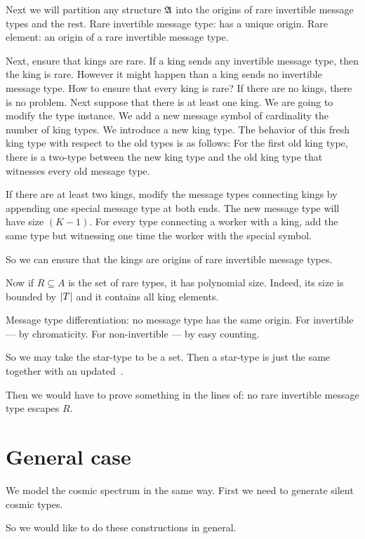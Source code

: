 Next we will partition any structure $\mathfrak{A}$ into the origins of rare invertible
message types and the rest.
Rare invertible message type: has a unique origin.
Rare element: an origin of a rare invertible message type.

Next, ensure that kings are rare.
If a king sends any invertible message type, then the king is rare.
However it might happen than a king sends no invertible message type.
How to ensure that every king is rare?
If there are no kings, there is no problem.
Next suppose that there is at least one king.
We are going to modify the type instance.
We add a new message symbol of cardinality the number of king types.
We introduce a new king type.
The behavior of this fresh king type with respect to the old types is as
follows:
For the first old king type, there is a two-type between the new king type and
the old king type that witnesses every old message type.

If there are at least two kings, modify the message types connecting kings by
appending one special message type at both ends.
The new message type will have size $(K-1)$.
For every type connecting a worker with a king, add the same type but witnessing
one time the worker with the special symbol.

So we can ensure that the kings are origins of rare invertible message types.

Now if $R \subseteq A$ is the set of rare types, it has polynomial size.
Indeed, its size is bounded by $\left|T\right|$ and it contains all king elements.

Message type differentiation: no message type has the same origin.
For invertible --- by chromaticity.
For non-invertible --- by easy counting.

So we may take the star-type to be a set.
Then a star-type is just the same together with an updated~.

Then we would have to prove something in the lines of: no rare invertible
message type escapes $R$.

\section{General case}
We model the cosmic spectrum in the same way.
First we need to generate silent cosmic types.

So we would like to do these constructions in general.
